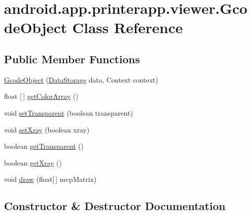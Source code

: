 \hypertarget{classandroid_1_1app_1_1printerapp_1_1viewer_1_1_gcode_object}{}\section{android.\+app.\+printerapp.\+viewer.\+Gcode\+Object Class Reference}
\label{classandroid_1_1app_1_1printerapp_1_1viewer_1_1_gcode_object}
\subsection*{Public Member Functions}
\begin{DoxyCompactItemize}
\item 
\hyperlink{classandroid_1_1app_1_1printerapp_1_1viewer_1_1_gcode_object_a2a0b1cbf817c30a2b494f46ec7404086}{Gcode\+Object} (\hyperlink{classandroid_1_1app_1_1printerapp_1_1viewer_1_1_data_storage}{Data\+Storage} data, Context context)
\item 
float \mbox{[}$\,$\mbox{]} \hyperlink{classandroid_1_1app_1_1printerapp_1_1viewer_1_1_gcode_object_af11100ba32c44e85e218d5823788fe7b}{get\+Color\+Array} ()
\item 
void \hyperlink{classandroid_1_1app_1_1printerapp_1_1viewer_1_1_gcode_object_aebd6271d5c0d56f271d89fa021ad75a9}{set\+Transparent} (boolean transparent)
\item 
void \hyperlink{classandroid_1_1app_1_1printerapp_1_1viewer_1_1_gcode_object_a0533caadc145d53c110bfa4190a14157}{set\+Xray} (boolean xray)
\item 
boolean \hyperlink{classandroid_1_1app_1_1printerapp_1_1viewer_1_1_gcode_object_ab1aa1ebd706f61114bdfec862ed9180a}{get\+Transparent} ()
\item 
boolean \hyperlink{classandroid_1_1app_1_1printerapp_1_1viewer_1_1_gcode_object_af17ba2439e97268658b30d191b271bff}{get\+Xray} ()
\item 
void \hyperlink{classandroid_1_1app_1_1printerapp_1_1viewer_1_1_gcode_object_a4d18ba00731dc6c28b73e59e886f3b32}{draw} (float\mbox{[}$\,$\mbox{]} mvp\+Matrix)
\end{DoxyCompactItemize}


\subsection{Constructor \& Destructor Documentation}
\mbox{\label{classandroid_1_1app_1_1printerapp_1_1viewer_1_1_gcode_object_a2a0b1cbf817c30a2b494f46ec7404086}} 
